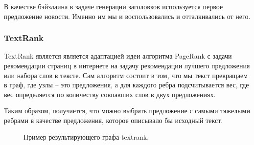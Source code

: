 \documentclass[aps,%
12pt,%
final,%
oneside,
onecolumn,%
musixtex, %
superscriptaddress,%
centertags]{article} %
\begin{document}
В качестве бэйзлаина в задаче генерации заголовков используется первое предложение новости. Именно им мы и воспользовались и отталкивались от него.


\subsubsection{TextRank}

TextRank является является адаптацией идеи алгоритма PageRank \cite{Page98thepagerank} с задачи рекомендации страниц в интернете на задачу рекомендации лучшего предложения или набора слов в тексте. Сам алгоритм состоит в том, что мы текст превращаем в граф, где узлы -- это предложения, а для каждого ребра подсчитывается вес, где вес определяется по количеству совпавших слов в двух предложениях.

Таким образом, получается, что можно выбрать предложение с самыми тяжелыми ребрами в качестве предложения, которое описывало бы исходный текст.

\begin{figure}[ht]
\begin{center}


\caption{
\label{text_rank_example_graph}
        Пример результирующего графа textrank.}
\end {center}
\end {figure}
\end{document}
